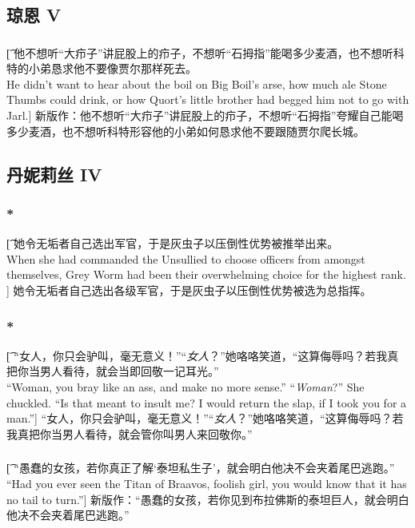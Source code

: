 \documentclass[12pt,a4paper]{article}
\begin{document}
\subsection{琼恩 V}
\subsubsection{}\t[
	他不想听“大疖子”讲屁股上的疖子，不想听“石拇指”能喝多少麦酒，也不想听科特的小弟恳求他不要像贾尔那样死去。\\
	He didn't want to hear about the boil on Big Boil's arse, how much ale Stone Thumbs could drink, or how Quort's little brother had begged him not to go with Jarl.]
	新版作：他不想听“大疖子”讲屁股上的疖子，不想听“石拇指”夸耀自己能喝多少麦酒，也不想听科特形容他的小弟如何恳求他不要跟随贾尔爬长城。
	

\subsection{丹妮莉丝 IV}
\subsubsection{\color{red}*}\t[
	她令无垢者自己选出军官，于是灰虫子以压倒性优势被推举出来。\\
	When she had commanded the Unsullied to choose officers from amongst themselves, Grey Worm had been their overwhelming choice for the highest rank. ]
	她令无垢者自己选出各级军官，于是灰虫子以压倒性优势被选为总指挥。
	
\subsubsection{\color{red}*}\t[
	“女人，你只会驴叫，毫无意义！”“\emph{女人}？”她咯咯笑道，“这算侮辱吗？若我真把你当男人看待，就会当即回敬一记耳光。”\\
	“Woman, you bray like an ass, and make no more sense.” “\emph{Woman}?” She chuckled. “Is that meant to insult me? I would return the slap, if I took you for a man.”]
	“女人，你只会驴叫，毫无意义！”“\emph{女人}？”她咯咯笑道，“这算侮辱吗？若我真把你当男人看待，就会管你叫男人来回敬你。”
	
\subsubsection{}\t[
	“愚蠢的女孩，若你真正了解‘泰坦私生子’，就会明白他决不会夹着尾巴逃跑。”\\
	“Had you ever seen the Titan of Braavos, foolish girl, you would know that it has no tail to turn.”]
	新版作：“愚蠢的女孩，若你见到布拉佛斯的泰坦巨人，就会明白他决不会夹着尾巴逃跑。”
	
\end{document}
